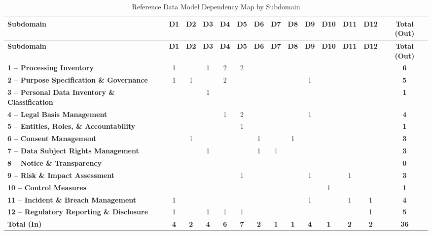 \documentclass[10pt,letterpaper,twocolumn,twoside]{rho-class/rho}
\begin{document}
\begin{scriptsize}
\setlength{\tabcolsep}{3pt}
\renewcommand{\arraystretch}{1.15}

\begin{longtable}{p{}ccccccccccccc}
\caption{Reference Data Model Dependency Map by Subdomain}
\label{tab:reference-data-model-dependency-map} \\

\hline
\textbf{Subdomain} &
\textbf{D1} &
\textbf{D2} &
\textbf{D3} &
\textbf{D4} &
\textbf{D5} &
\textbf{D6} &
\textbf{D7} &
\textbf{D8} &
\textbf{D9} &
\textbf{D10} &
\textbf{D11} &
\textbf{D12} &
\textbf{Total (Out)} \\
\hline
\endfirsthead

\hline
\textbf{Subdomain} &
\textbf{D1} &
\textbf{D2} &
\textbf{D3} &
\textbf{D4} &
\textbf{D5} &
\textbf{D6} &
\textbf{D7} &
\textbf{D8} &
\textbf{D9} &
\textbf{D10} &
\textbf{D11} &
\textbf{D12} &
\textbf{Total (Out)} \\
\hline
\endhead

\hline
\endfoot

\hline
\endlastfoot

\textbf{1 -- Processing Inventory} & 1 &  & 1 & 2 & 2 &  &  &  &  &  &  &  & \textbf{6} \\
\textbf{2 -- Purpose Specification \& Governance} & 1 & 1 &  & 2 &  &  &  &  & 1 &  &  &  & \textbf{5} \\
\textbf{3 -- Personal Data Inventory \& Classification} &  &  & 1 &  &  &  &  &  &  &  &  &  & \textbf{1} \\
\textbf{4 -- Legal Basis Management} &  &  &  & 1 & 2 &  &  &  & 1 &  &  &  & \textbf{4} \\
\textbf{5 -- Entities, Roles, \& Accountability} &  &  &  &  & 1 &  &  &  &  &  &  &  & \textbf{1} \\
\textbf{6 -- Consent Management} &  & 1 &  &  &  & 1 &  & 1 &  &  &  &  & \textbf{3} \\
\textbf{7 -- Data Subject Rights Management} &  &  & 1 &  &  & 1 & 1 &  &  &  &  &  & \textbf{3} \\
\textbf{8 -- Notice \& Transparency} &  &  &  &  &  &  &  &  &  &  &  &  & \textbf{0} \\
\textbf{9 -- Risk \& Impact Assessment} &  &  &  &  & 1 &  &  &  & 1 &  & 1 &  & \textbf{3} \\
\textbf{10 -- Control Measures} &  &  &  &  &  &  &  &  &  & 1 &  &  & \textbf{1} \\
\textbf{11 -- Incident \& Breach Management} & 1 &  &  &  &  &  &  &  & 1 &  & 1 & 1 & \textbf{4} \\
\textbf{12 -- Regulatory Reporting \& Disclosure} & 1 &  & 1 & 1 & 1 &  &  &  &  &  &  & 1 & \textbf{5} \\
\hline
\textbf{Total (In)} & \textbf{4} & \textbf{2} & \textbf{4} & \textbf{6} & \textbf{7} & \textbf{2} & \textbf{1} & \textbf{1} & \textbf{4} & \textbf{1} & \textbf{2} & \textbf{2} & \textbf{36} \\

\end{longtable}
\end{scriptsize}
\toggletrue{trackcited}
\clearpage
\end{document}
